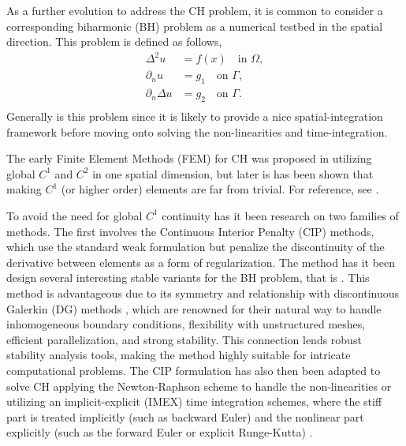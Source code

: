 As a further evolution to address the CH problem, it is common to consider a corresponding biharmonic (BH) problem as a numerical testbed in the spatial direction. This problem is defined as follows, \[
\begin{split}
    \Delta ^2 u & = f( x) \quad \text{in }  \Omega, \\
    \partial _{n} u & = g_{1} \quad \text{on } \Gamma,   \\
    \partial _{n} \Delta  u & = g_{2} \quad \text{on } \Gamma.   \\
\end{split}
\]
Generally is this problem since it is likely to provide a nice spatial-integration framework before moving onto solving the non-linearities and time-integration.

The early Finite Element Methods (FEM) for CH was proposed in \cite{elliott1987numerical, elliott1986cahn} utilizing global $C^{1}$ and $C^{2}$ in one spatial dimension, but later is has been shown that making $C^{1}$ (or higher order) elements are far from trivial. For
reference, see \cite{kapl2021family, percell1976cubic, argyris1968tuba}.

To avoid the need for global $C^1$ continuity has it been research on two families of methods.
The first involves the Continuous Interior Penalty (CIP) methods, which use the standard weak formulation but penalize the discontinuity of the derivative between elements as a form of regularization. The method has it been design several interesting
stable variants for the BH problem, that is \cite{brenner2012, brenner2012quadratic, brenner2012quadratic_kirk, mu2014weak, georgoulis2009discontinuous}.
This method is advantageous due to its symmetry and relationship with discontinuous Galerkin (DG) methods \cite{di2011mathematical}, which are renowned for their natural way to handle inhomogeneous boundary conditions, flexibility with unstructured meshes, efficient parallelization, and strong stability. This connection lends robust stability analysis tools, making the method highly suitable for intricate computational problems.
The CIP formulation has also then been adapted to solve CH applying the Newton-Raphson scheme to handle the non-linearities \cite{wells2006discontinuous} or utilizing an implicit-explicit (IMEX) time integration schemes, where the stiff part is treated implicitly (such as backward Euler) and the nonlinear part explicitly (such as the forward
Euler or explicit Runge-Kutta) \cite{ feng2007fully}.

